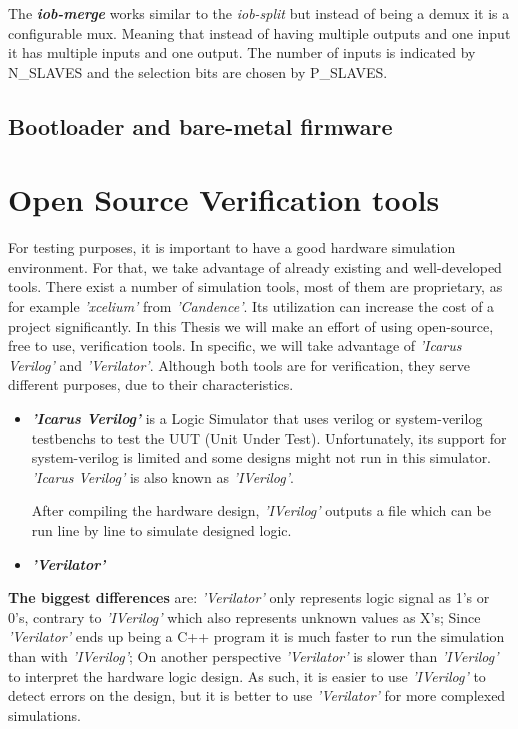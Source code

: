 The \textbf{\textit{iob-merge}} works similar to the \textit{iob-split} but instead of being a \acrshort{demux} it is a configurable \acrfull{mux}. Meaning that instead of having multiple outputs and one input it has multiple inputs and one output. The number of inputs is indicated by N\_SLAVES and the selection bits are chosen by P\_SLAVES.

\subsection{Bootloader and bare-metal firmware}

\section{Open Source Verification tools}
For testing purposes, it is important to have a good hardware simulation environment. For that, we take advantage of already existing and well-developed tools. There exist a number of simulation tools, most of them are proprietary, as for example \textit{'xcelium'} from \textit{'Candence'}. Its utilization can increase the cost of a project significantly. In this Thesis we will make an effort of using open-source, free to use, verification tools. In specific, we will take advantage of \textit{'Icarus Verilog'} and \textit{'Verilator'}. Although both tools are for verification, they serve different purposes, due to their characteristics.

\begin{itemize}
    \item \textbf{\textit{'Icarus Verilog'}} is a Logic Simulator that uses verilog or system-verilog testbenchs to test the UUT (Unit Under Test). Unfortunately, its support for system-verilog is limited and some designs might not run in this simulator. \textit{'Icarus Verilog'} is also known as \textit{'IVerilog'}.
    
    After compiling the hardware design, \textit{'IVerilog'} outputs a file which can be run line by line to simulate designed logic.
    
    \item \textbf{\textit{'Verilator'}}
\end{itemize}

\textbf{The biggest differences} are: \textit{'Verilator'} only represents logic signal as 1's or 0's, contrary to \textit{'IVerilog'} which also represents unknown values as X's; Since \textit{'Verilator'} ends up being a C++ program it is much faster to run the simulation than with \textit{'IVerilog'}; On another perspective \textit{'Verilator'} is slower than \textit{'IVerilog'} to interpret the hardware logic design.
As such, it is easier to use \textit{'IVerilog'} to detect errors on the design, but it is better to use \textit{'Verilator'} for more complexed simulations.

